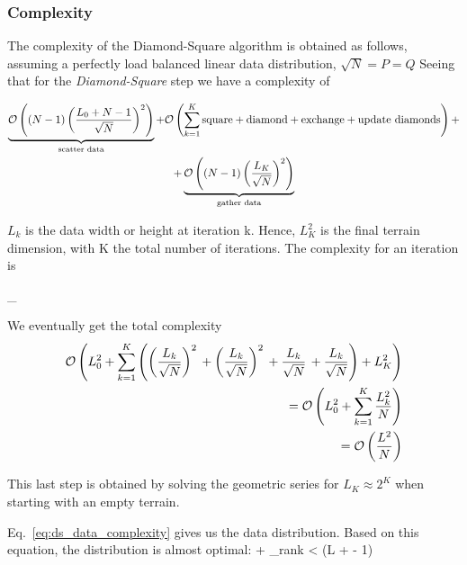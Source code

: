 \subsubsection{Complexity}
The complexity of the Diamond-Square algorithm is obtained as follows, assuming a perfectly load balanced linear data distribution, $\sqrt{N} = P = Q$
Seeing that  for the {\em Diamond-Square} step we have a complexity of

\begin{multline}
\underbrace{{\cal O}\left((N-1) \left(\frac{L_0 + N - 1}{\sqrt{N}}\right)^2\right)}_{\text{scatter data}} + {\cal O}\left(\sum\limits_{k = 1}^{K} \text{square} + \text{diamond} + \text{exchange} + \text{update diamonds}\right) +\\+ \underbrace{{\cal O}\left((N-1) \left(\frac{L_K}{\sqrt{N}}\right)^2\right)}_{\text{gather data}}
\end{multline}

$L_k$ is the data width or height at iteration k. Hence, $L_K^2$ is the final terrain dimension, with K the total number of iterations. The complexity for an iteration is

\be
{}_{}
\ee

We eventually get the total complexity
\begin{equation}
\begin{split}
{\cal O}\left(L_0^2 + \sum\limits_{k = 1}^{K} \left(\left(\frac{L_k}{\sqrt{N}}\right)^2 \, + \left(\frac{L_k}{\sqrt{N}}\right)^2 \, + \frac{L_k}{\sqrt{N}}\, + \frac{L_k}{\sqrt{N}}\right) + L_K^2\right)\\
= {\cal O}\left(L_0^2 + \sum\limits_{k = 1}^{K} \frac{L_k^2}{N}\right)\\
= {\cal O}\left(\frac{L^2}{N}\right)
\end{split}
\end{equation}

This last step is obtained by solving the geometric series for $L_K \approx 2^K$ when starting with an empty terrain.

Eq.~\ref{eq:ds_data_complexity} gives us the data distribution. Based on this equation, the distribution is almost optimal:
\be
{} + _{rank < (L +  - 1) \mod {}}  
\nonumber
\ee


